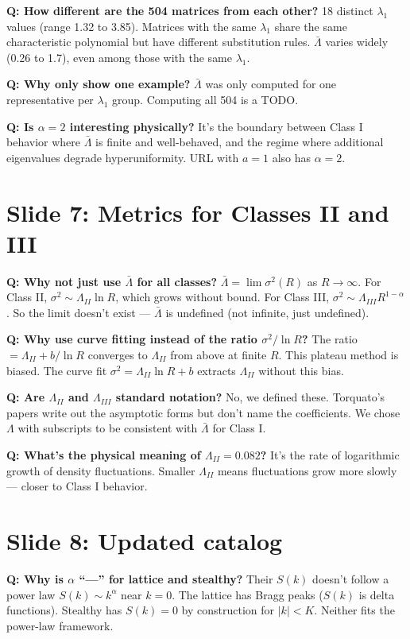 \documentclass[11pt]{article}
\newcommand{\Q}[1]{\textcolor{qcolor}{\textbf{Q: #1}}}
\begin{document}
\Q{How different are the 504 matrices from each other?}
18 distinct $\lambda_1$ values (range 1.32 to 3.85). Matrices with the same $\lambda_1$ share the same characteristic polynomial but have different substitution rules. $\bar\Lambda$ varies widely (0.26 to 1.7), even among those with the same $\lambda_1$.

\Q{Why only show one example?}
$\bar\Lambda$ was only computed for one representative per $\lambda_1$ group. Computing all 504 is a TODO.

\Q{Is $\alpha=2$ interesting physically?}
It's the boundary between Class I behavior where $\bar\Lambda$ is finite and well-behaved, and the regime where additional eigenvalues degrade hyperuniformity. URL with $a=1$ also has $\alpha=2$.

\section{Slide 7: Metrics for Classes II and III}

\Q{Why not just use $\bar\Lambda$ for all classes?}
$\bar\Lambda = \lim \sigma^2(R)$ as $R\to\infty$. For Class II, $\sigma^2 \sim \Lambda_{II}\ln R$, which grows without bound. For Class III, $\sigma^2 \sim \Lambda_{III} R^{1-\alpha}$. So the limit doesn't exist --- $\bar\Lambda$ is undefined (not infinite, just undefined).

\Q{Why use curve fitting instead of the ratio $\sigma^2/\ln R$?}
The ratio $= \Lambda_{II} + b/\ln R$ converges to $\Lambda_{II}$ from above at finite $R$. This plateau method is biased. The curve fit $\sigma^2 = \Lambda_{II}\ln R + b$ extracts $\Lambda_{II}$ without this bias.

\Q{Are $\Lambda_{II}$ and $\Lambda_{III}$ standard notation?}
No, we defined these. Torquato's papers write out the asymptotic forms but don't name the coefficients. We chose $\Lambda$ with subscripts to be consistent with $\bar\Lambda$ for Class I.

\Q{What's the physical meaning of $\Lambda_{II} = 0.082$?}
It's the rate of logarithmic growth of density fluctuations. Smaller $\Lambda_{II}$ means fluctuations grow more slowly --- closer to Class I behavior.

\section{Slide 8: Updated catalog}

\Q{Why is $\alpha$ ``---'' for lattice and stealthy?}
Their $S(k)$ doesn't follow a power law $S(k)\sim k^\alpha$ near $k=0$. The lattice has Bragg peaks ($S(k)$ is delta functions). Stealthy has $S(k)=0$ by construction for $|k|<K$. Neither fits the power-law framework.
\end{document}

